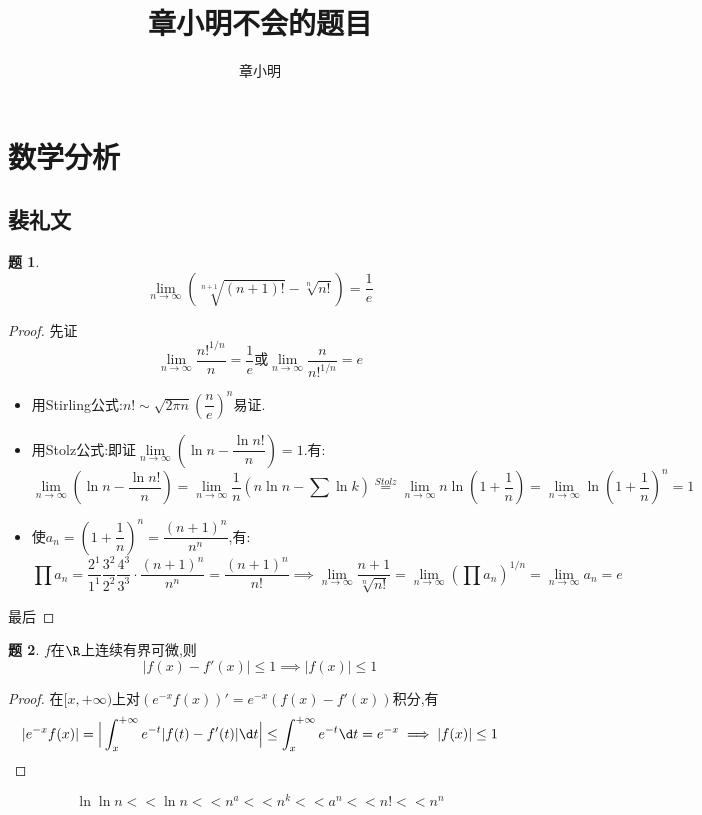 \documentclass{article}
\title{章小明不会的题目}
\author{章小明}
\theoremstyle{definition}
\newtheorem{exercise}{题}[section]
\begin{document}
\maketitle
\tableofcontents

\section{数学分析}
\subsection{裴礼文}
\begin{exercise}
    $$\lim_{n\to \infty}\left(\sqrt[n+1]{(n+1)!}-\sqrt[n]{n!} \right)=\frac{1}{e}$$
\end{exercise}
\begin{proof}
    先证$$\lim_{n\to \infty}\frac{n!^{1/n}}{n}=\frac{1}{e}\text{或}\lim_{n\to \infty}\frac{n}{n!^{1/n}}=e$$
    \begin{itemize}
        \item 用Stirling公式:$n!\sim \sqrt{2\pi n}\left( \dfrac{n}{e} \right)^n$易证.
        \item 用Stolz公式:即证$\lim\limits_{n\to \infty}\left( \ln n-\dfrac{\ln n!}{n} \right)=1$.有:
        $$\lim_{n\to \infty}\left( \ln n-\frac{\ln n!}{n} \right)=\lim_{n\to \infty} \frac{1}{n}\left( n\ln n-\sum \ln k \right)\stackrel{Stolz}{=}\lim_{n\to \infty} n\ln\left( 1+\frac{1}{n} \right)=\lim_{n\to \infty}\ln\left( 1+\frac{1}{n} \right)^n=1$$
        \item 使$a_n=\left( 1+\dfrac{1}{n} \right)^n=\dfrac{(n+1)^n}{n^n}$,有:
        $$\prod a_n=\frac{2^1}{1^1}\frac{3^2}{2^2}\frac{4^3}{3^3}\cdot\frac{(n+1)^n}{n^n}=\frac{(n+1)^n}{n!}\implies \lim_{n\to \infty} \frac{n+1}{\sqrt[n]{n!}}=\lim_{n\to \infty}\left( \prod a_n \right)^{1/n}=\lim_{n\to \infty} a_n=e$$
    \end{itemize}
    最后
\end{proof}

\begin{exercise}
    $f$在$\R$上连续有界可微,则$$|f(x)-f'(x)|\leq 1\implies |f(x)|\leq 1$$
\end{exercise}
\begin{proof}
    在$[x,+\infty)$上对$(e^{-x}f(x))'=e^{-x}\left( f(x)-f'(x) \right)$积分,有\[|e^{-x}f(x)|=\Big|\int_x^{+\infty}e^{-t}|f(t)-f'(t)|\d t\Big|\leq \int_x^{+\infty}e^{-t}\d t=e^{-x}\implies |f(x)|\leq 1\]
\end{proof}

$$\ln\ln n<\!\!<\ln n<\!\!<n^a<\!\!<n^k<\!\!<a^n<\!\!<n!<\!\!<n^n$$
\end{document}
